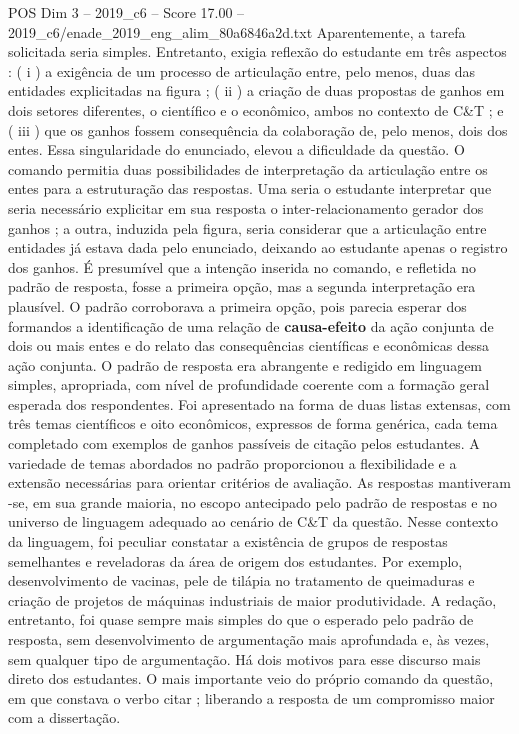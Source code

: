 \begin{textsample}{POS Dim 3 – 2019\_c6 – Score 17.00 – 2019\_c6/enade\_2019\_eng\_alim\_80a6846a2d.txt}
Aparentemente, a tarefa solicitada seria simples.
Entretanto, exigia reflexão do estudante em três aspectos : ( i ) a exigência de um processo de articulação entre, pelo menos, duas das entidades explicitadas na figura ; ( ii ) a criação de duas propostas de ganhos em dois setores diferentes, o científico e o econômico, ambos no contexto de C\&T ; e ( iii ) que os ganhos fossem consequência da colaboração de, pelo menos, dois dos entes.
Essa singularidade do enunciado, elevou a dificuldade da questão.
O comando permitia duas possibilidades de interpretação da articulação entre os entes para a estruturação das respostas.
Uma seria o estudante interpretar que seria necessário explicitar em sua resposta o inter-relacionamento gerador dos ganhos ; a outra, induzida pela figura, seria considerar que a articulação entre entidades já estava dada pelo enunciado, deixando ao estudante apenas o registro dos ganhos.
É presumível que a intenção inserida no comando, e refletida no padrão de resposta, fosse a primeira opção, mas a segunda interpretação era plausível.
O padrão corroborava a primeira opção, pois parecia esperar dos formandos a identificação de uma relação de \textbf{causa-efeito} da ação conjunta de dois ou mais entes e do relato das consequências científicas e econômicas dessa ação conjunta.
O padrão de resposta era abrangente e redigido em linguagem simples, apropriada, com nível de profundidade coerente com a formação geral esperada dos respondentes.
Foi apresentado na forma de duas listas extensas, com três temas científicos e oito econômicos, expressos de forma genérica, cada tema completado com exemplos de ganhos passíveis de citação pelos estudantes.
A variedade de temas abordados no padrão proporcionou a flexibilidade e a extensão necessárias para orientar critérios de avaliação.
As respostas mantiveram -se, em sua grande maioria, no escopo antecipado pelo padrão de respostas e no universo de linguagem adequado ao cenário de C\&T da questão.
Nesse contexto da linguagem, foi peculiar constatar a existência de grupos de respostas semelhantes e reveladoras da área de origem dos estudantes.
Por exemplo, desenvolvimento de vacinas, pele de tilápia no tratamento de queimaduras e criação de projetos de máquinas industriais de maior produtividade.
A redação, entretanto, foi quase sempre mais simples do que o esperado pelo padrão de resposta, sem desenvolvimento de argumentação mais aprofundada e, às vezes, sem qualquer tipo de argumentação.
Há dois motivos para esse discurso mais direto dos estudantes.
O mais importante veio do próprio comando da questão, em que constava o verbo citar ; liberando a resposta de um compromisso maior com a dissertação.

\end{textsample}

